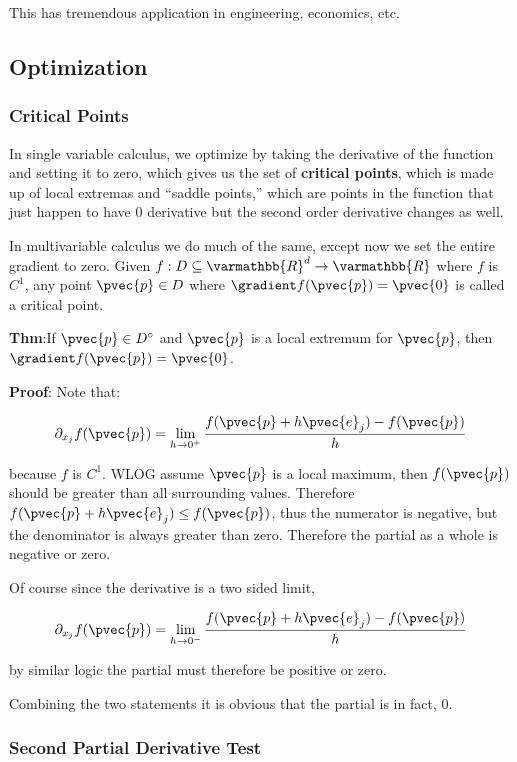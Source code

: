 \documentclass[11 pt, twoside]{article}
\begin{document}
This has tremendous application in engineering, economics, etc.
\subsection{Optimization}
\subsubsection{Critical Points}
In single variable calculus, we optimize by taking the derivative of the
function and setting it to zero, which gives us the set of \textbf{critical
points}, which is made up of local extremas and ``saddle points,'' which are
points in the function that just happen to have 0 derivative but the second
order derivative changes as well.

In multivariable calculus we do much of the same, except now we set the entire
gradient to zero. Given $f: D \subseteq \varmathbb{R}^d \to \varmathbb{R}$ where
$f$ is $C^1$, any point $\pvec{p} \in D$ where $\gradient f(\pvec{p}) = \pvec{0}$
is called a critical point.

\textbf{Thm}:If $\pvec{p} \in D^\circ$ and $\pvec{p}$ is a local extremum for
$\pvec{p}$, then $\gradient f(\pvec{p}) = \pvec{0}$.

\textbf{Proof}: Note that:

$$\partial_{x_j} f(\pvec{p}) = \lim_{h \to 0^+} \frac{f(\pvec{p} +
h\pvec{e}_j) - f(\pvec{p})}{h}$$

because $f$ is $C^1$. WLOG assume $\pvec{p}$ is a local maximum, then
$f(\pvec{p})$ should be greater than all surrounding values. Therefore $f(\pvec{p}
+ h\pvec{e}_j) \leq f(\pvec{p})$, thus the numerator is negative, but the denominator
is always greater than zero. Therefore the partial as a whole is negative or
zero.

Of course since the derivative is a two sided limit, 

$$\partial_{x_j} f(\pvec{p}) = \lim_{h \to 0^-} \frac{f(\pvec{p} +
h\pvec{e}_j) - f(\pvec{p})}{h}$$

by similar logic the partial must therefore be positive or zero.

Combining the two statements it is obvious that the partial is in fact, 0.

\subsubsection{Second Partial Derivative Test}
\end{document}
